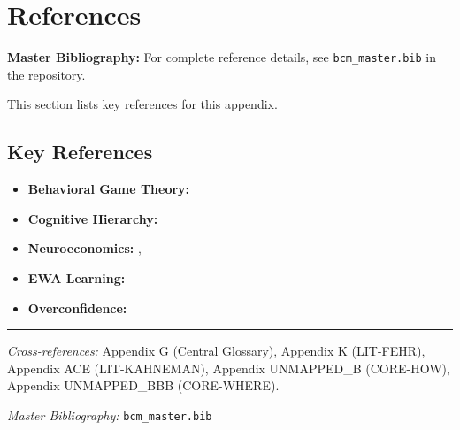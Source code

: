 \section{References}
\label{sec:ca-references}

\begin{tcolorbox}[colback=blue!5!white, colframe=blue!75!black]
\textbf{Master Bibliography:} For complete reference details, see
\texttt{bcm\_master.bib} in the repository.

This section lists key references for this appendix.
\end{tcolorbox}

\vspace{0.5em}

\subsection{Key References}

\begin{itemize}[nosep]
    \item \textbf{Behavioral Game Theory:} \citet{camerer2003behavioralbehavioral}
    \item \textbf{Cognitive Hierarchy:} \citet{camerer2004neuroeconomicscognitive}
    \item \textbf{Neuroeconomics:} \citet{camerer2004neuroeconomicsneuroeconomics}, \citet{fehr2007neurobiology}
    \item \textbf{EWA Learning:} \citet{camerer2005frame}
    \item \textbf{Overconfidence:} \citet{camerer1999overconfidence}
\end{itemize}

\nocite{bcm_master}



\vspace{1em}
\hrule
\vspace{0.5em}

\noindent\textit{Cross-references:}
Appendix G (Central Glossary),
Appendix K (LIT-FEHR),
Appendix ACE (LIT-KAHNEMAN),
Appendix UNMAPPED_B (CORE-HOW),
Appendix UNMAPPED_BBB (CORE-WHERE).

\noindent\textit{Master Bibliography:} \texttt{bcm\_master.bib}


